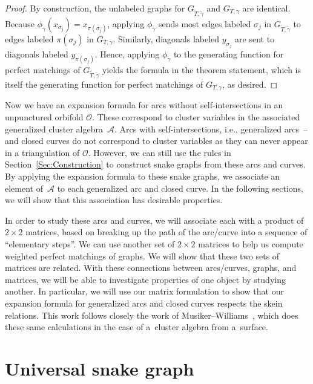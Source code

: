 \documentclass[11pt]{article}
\numberwithin{equation}{section}
\begin{document}
\begin{proof}
By construction, the unlabeled graphs for $G_{\widetilde{T},\widetilde{\gamma}}$ and $G_{T,\gamma}$ are identical. Because $\phi_\gamma(x_{\sigma_j}) = x_{\pi(\sigma_j)}$,
applying $\phi_\gamma$ sends most edges labeled $\sigma_j$ in $G_{\widetilde{T},\widetilde{\gamma}}$ to edges labeled $\pi(\sigma_j)$ in $G_{T,\gamma}$. Similarly, diagonals labeled $y_{\sigma_j}$ are sent to diagonals labeled $y_{\pi(\sigma_j)}$. Hence, applying $\phi_\gamma$ to the generating function for perfect matchings of $G_{\widetilde{T},\widetilde{\gamma}}$ yields the formula in the theorem statement, which is itself the generating function for perfect matchings of $G_{T,\gamma}$, as desired.
 \end{proof}

Now we have an expansion formula for arcs without self-intersections in an unpunctured orbifold $\mathcal{O}$. These correspond to cluster variables in the associated generalized cluster algebra~$\mathcal{A}$. Arcs with self-intersections, i.e., generalized arcs~-- and closed curves do not correspond to cluster variables as they can never appear in a triangulation of $\mathcal{O}$. However, we can still use the rules in Section~\ref{Sec:Construction} to construct snake graphs from these arcs and curves. By applying the expansion formula to these snake graphs, we associate an element of~$\mathcal{A}$ to each generalized arc and closed curve. In the following sections, we will show that this association has desirable properties.

In order to study these arcs and curves, we will associate each with a product of $2\times 2$ matrices, based on breaking up the path of the arc/curve into a sequence of ``elementary steps''. We can use another set of $2\times 2$ matrices to help us compute weighted perfect matchings of graphs. We will show that these two sets of matrices are related. With these connections between arcs/curves, graphs, and matrices, we will be able to investigate properties of one object by studying another. In particular, we will use our matrix formulation to show that our expansion formula for generalized arcs and closed curves respects the skein relations. This work follows closely the work of Musiker--Williams~\cite{MW}, which does these same calculations in the case of a~cluster algebra from a~surface.

\section{Universal snake graph}\label{sec:universalSnakeGraph}
\end{document}
